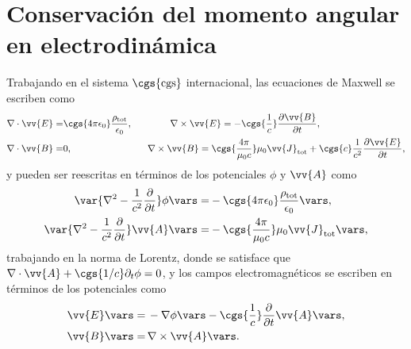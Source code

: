 \section{Conservación del momento angular en electrodinámica}
Trabajando en el sistema $\cgs{\text{cgs}}$ internacional, las ecuaciones de Maxwell se escriben como \cite{jackson}
\begin{align}
\nabla\cdot\vv{E} =& \cgs{4\pi\epsilon_0}\frac{\rho_{\text{tot}}}{\epsilon_0}, \qquad \qquad \nabla\times\vv{E}=-\cgs{\frac{1}{c}}\frac{\partial\vv{B}}{\partial t}, \nonumber \\
\nabla\cdot\vv{B} =& 0, \qquad \qquad \qquad \qquad \nabla\times\vv{B}=\cgs{\frac{4\pi}{\mu_0 c}}\mu_0\vv{J}_{\text{tot}}+\cgs{c}\frac{1}{c^2}\frac{\partial\vv{E}}{\partial t},
\label{eq: Maxwell equations}
\end{align}
y pueden ser reescritas en términos de los potenciales $\phi$ y $\vv{A}$ como \cite{jackson}
\begin{align}
\var{\nabla^2 -\frac{1}{c^2}\frac{\partial}{\partial t}}\phi\vars =& - \cgs{4\pi\epsilon_0} \frac{\rho_{\text{tot}}}{\epsilon_0}\vars, \label{eq: scalar potential}\\
\var{\nabla^2 -\frac{1}{c^2}\frac{\partial}{\partial t}}\vv{A}\vars =& - \cgs{\frac{4\pi}{\mu_0 c}}\mu_0 \vv{J}_{\text{tot}}\vars,\label{eq: vector potential}
\end{align}
trabajando en la norma de Lorentz, donde se satisface que $\nabla\cdot\vv{A}+\cgs{1/c}\partial_t \phi =0$, y los campos electromagnéticos se escriben en términos de los potenciales como
\begin{align}
\vv{E}\vars =& \, -\nabla\phi\vars - \cgs{\frac{1}{c}}\frac{\partial}{\partial t}\vv{A}\vars, \label{eq: E field potentials}\\
\vv{B}\vars =& \, \nabla\times\vv{A}\vars. \label{eq: B field potentials}
\end{align}


